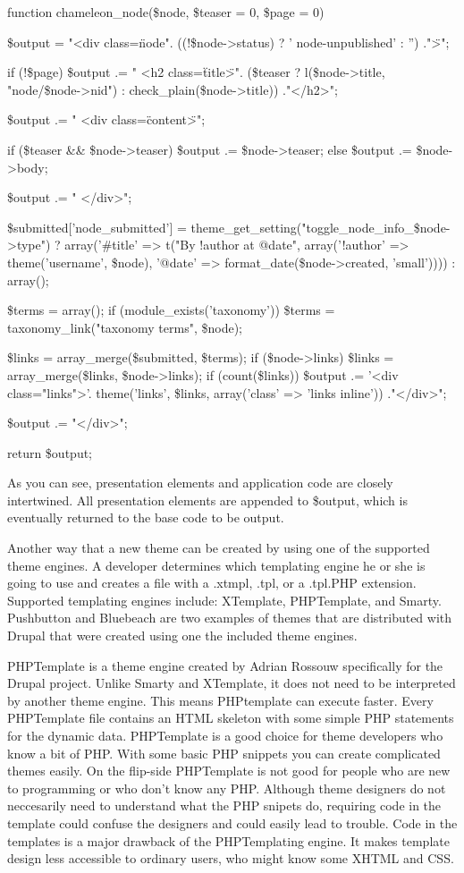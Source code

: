 \documentclass[a4paper,12pt]{report}
\begin{document}
function chameleon_node(\$node, \$teaser = 0, \$page = 0) {

  \$output  = "<div class=\"node". ((!\$node->status) ? ' node-unpublished' : '') ."\">\n";

  if (!\$page) {
    \$output .= " <h2 class=\"title\">". (\$teaser ? l(\$node->title, "node/\$node->nid") : check_plain(\$node->title)) ."</h2>\n";
  }

  \$output .= " <div class=\"content\">\n";

  if (\$teaser && \$node->teaser) {
    \$output .= \$node->teaser;
  }
  else {
    \$output .= \$node->body;
  }

  \$output .= " </div>\n";

  \$submitted['node_submitted'] = theme_get_setting("toggle_node_info_\$node->type") ? array('#title' => t("By !author at @date", array('!author' => theme('username', \$node), '@date' => format_date(\$node->created, 'small')))) : array();

  \$terms = array();
  if (module_exists('taxonomy')) {
    \$terms = taxonomy_link("taxonomy terms", \$node);
  }

  \$links = array_merge(\$submitted, \$terms);
  if (\$node->links) {
    \$links = array_merge(\$links, \$node->links);
  }
  if (count(\$links)) {
    \$output .= '<div class="links">'. theme('links', \$links, array('class' => 'links inline')) ."</div>\n";
  }

  \$output .= "</div>\n";

  return \$output;
} 

As you can see, presentation elements and application code are closely intertwined. 
All presentation elements are appended to \$output, which is eventually returned to the base code to be output.


Another way that a new theme can be created by using one of the supported theme engines. 
A developer determines which templating engine he or she is going to use and creates a file with a .xtmpl, .tpl, or a .tpl.PHP extension. 
Supported templating engines include: XTemplate, PHPTemplate, and Smarty. 
Pushbutton and Bluebeach are two examples of themes that are distributed with Drupal that were created using one the included theme engines. 


PHPTemplate is a theme engine created by Adrian Rossouw specifically for the Drupal project. 
Unlike Smarty and XTemplate, it does not need to be interpreted by another theme engine. 
This means PHPtemplate can execute faster. 
Every PHPTemplate file contains an HTML skeleton with some simple PHP statements for the dynamic data. 
PHPTemplate is a good choice for theme developers who know a bit of PHP. With some basic PHP snippets you can create complicated themes easily. 
On the flip-side PHPTemplate is not good for people who are new to programming or who don't know any PHP. 
Although theme designers do not neccesarily need to understand what the PHP snipets do, requiring code in the template could confuse the designers and could easily lead to trouble. 
Code in the templates is a major drawback of the PHPTemplating engine. 
It makes template design less accessible to ordinary users, who might know some XHTML and CSS. 
\end{document}
